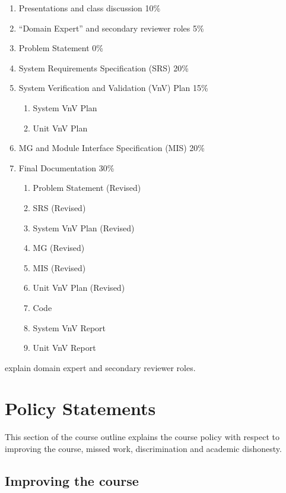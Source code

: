 \documentclass[12pt]{article}
\begin{document}
\begin {enumerate}

\item Presentations and class discussion 10\%

\item ``Domain Expert'' and secondary reviewer roles 5\%

\item Problem Statement 0\%

\item System Requirements Specification (SRS) 20\%

\item System Verification and Validation (VnV) Plan 15\%
\begin{enumerate}
\item System VnV Plan
\item Unit VnV Plan
\end{enumerate}

\item MG and Module Interface Specification (MIS) 20\%

\item Final Documentation 30\%
\begin{enumerate}
\item Problem Statement (Revised)
\item SRS (Revised)
\item System VnV Plan (Revised)
\item MG (Revised)
\item MIS (Revised)
\item Unit VnV Plan (Revised)
\item Code
\item System VnV Report
\item Unit VnV Report
\end{enumerate}

\end {enumerate}

explain domain expert and secondary reviewer roles.

\section {Policy Statements}

This section of the course outline explains the course policy with respect to
improving the course, missed work, discrimination and academic dishonesty.

\subsection {Improving the course}
\end{document}
